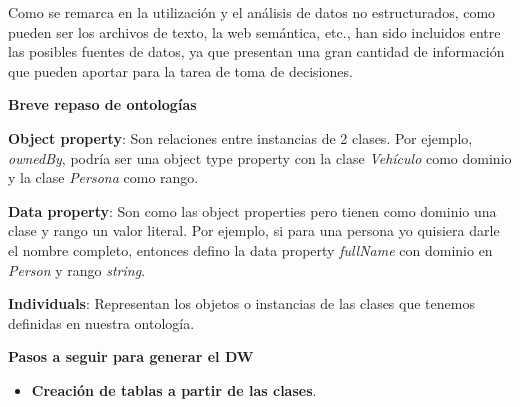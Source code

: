 \documentclass{fancyslides}
\begin{document}
\begin{frame}
\end{frame}

\begin{frame}
\misc
{ 
\justifying Como se remarca en \cite{OntologyPaper} la utilización y el análisis de datos no estructurados, como pueden ser los archivos de texto, la web semántica, etc., han sido incluidos entre las posibles fuentes de datos, ya que presentan una gran cantidad de información que pueden aportar para la tarea de toma de decisiones.

}
\end{frame}

\begin{frame}
\misc
{ \textbf{\Large Breve repaso de ontologías}
\newline
\newline

\justifying \textbf{Object property}: Son relaciones entre instancias de 2 clases. Por ejemplo, \textit{ownedBy}, podría ser una object type property con la clase \textit{Vehículo} como dominio y la clase \textit{Persona} como rango.

\justifying \textbf{Data property}: Son como las object properties pero tienen como dominio una clase y rango un valor literal. Por ejemplo, si para una persona yo quisiera darle el nombre completo, entonces defino la data property \textit{fullName} con dominio en \textit{Person} y rango \textit{string}.

\justifying \textbf{Individuals}: Representan los objetos o instancias de las clases que tenemos definidas en nuestra ontología.

}
\end{frame}


\begin{frame}
\misc
{ \textbf{\Large Pasos a seguir para generar el DW}
\newline
\newline

\begin{itemize}
  \item \textbf{Creación de tablas a partir de las clases}.
\end{itemize}


}
\end{frame}
\end{document}
